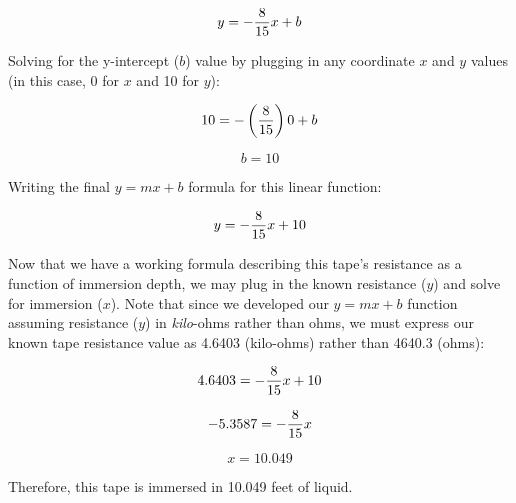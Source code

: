 $$y = -{8 \over 15}x + b$$

\vskip 10pt

Solving for the y-intercept ($b$) value by plugging in any coordinate $x$ and $y$ values (in this case, 0 for $x$ and 10 for $y$):

$$10 = -\left({8 \over 15} \right) 0 + b$$

$$b = 10$$

\vskip 10pt

Writing the final $y = mx + b$ formula for this linear function:

$$y = -{8 \over 15}x + 10$$

\vskip 10pt

\filbreak

Now that we have a working formula describing this tape's resistance as a function of immersion depth, we may plug in the known resistance ($y$) and solve for immersion ($x$).  Note that since we developed our $y = mx + b$ function assuming resistance ($y$) in {\it kilo}-ohms rather than ohms, we must express our known tape resistance value as 4.6403 (kilo-ohms) rather than 4640.3 (ohms):

$$4.6403 = -{8 \over 15}x + 10$$

$$-5.3587 = -{8 \over 15}x$$

$$x = 10.049$$

Therefore, this tape is immersed in 10.049 feet of liquid.









